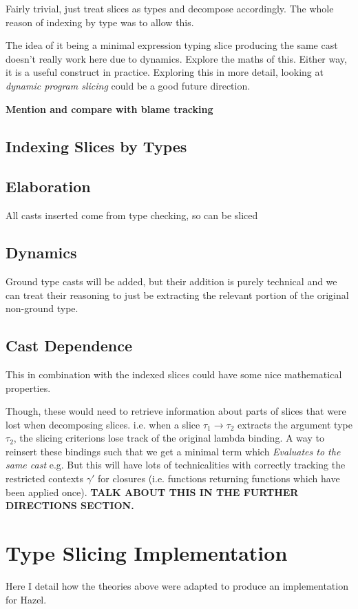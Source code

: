 Fairly trivial, just treat slices as types and decompose accordingly. The whole reason of indexing by type was to allow this.

The idea of it being a minimal expression typing slice producing the same cast doesn't really work here due to dynamics. Explore the maths of this. Either way, it is a useful construct in practice. Exploring this in more detail, looking at \textit{dynamic program slicing} could be a good future direction.

\textbf{Mention and compare with blame tracking}

\subsection{Indexing Slices by Types}


\subsection{Elaboration}
All casts inserted come from type checking, so can be sliced

\subsection{Dynamics}
Ground type casts will be added, but their addition is purely technical and we can treat their reasoning to just be extracting the relevant portion of the original non-ground type.

\subsection{Cast Dependence}
This in combination with the indexed slices could have some nice mathematical properties.

Though, these would need to retrieve information about parts of slices that were lost when decomposing slices. i.e. when a slice $\tau_1 \to \tau_2$ extracts the argument type $\tau_2$, the slicing criterions lose track of the original lambda binding. A way to reinsert these bindings such that we get a minimal term which \textit{Evaluates to the same cast} e.g. But this will have lots of technicalities with correctly tracking the restricted contexts $\gamma'$ for closures (i.e. functions returning functions which have been applied once). \textbf{TALK ABOUT THIS IN THE FURTHER DIRECTIONS SECTION.}

\section{Type Slicing Implementation}\label{sec:TypeSlicingImplementation}
Here I detail how the theories above were adapted to produce an implementation for Hazel.
